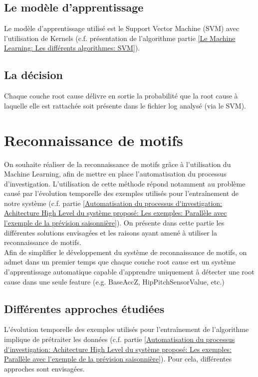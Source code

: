 \subsection{Le modèle d'apprentissage}
\label{Automatisation du processus d'investigation: Achitecture High Level du système proposé: Le modèle d'apprentissage}
Le modèle d'apprentissage utilisé est le Support Vector Machine (SVM) avec l'utilisation de Kernels (c.f. présentation de l'algorithme partie \ref{Le Machine Learning: Les différents algorithmes: SVM}).


\subsection{La décision}
\label{Automatisation du processus d'investigation: Achitecture High Level du système proposé: La décision}
Chaque couche root cause délivre en sortie la probabilité que la root cause à laquelle elle est rattachée soit présente dans le fichier log analysé (via le SVM).



\section{Reconnaissance de motifs}
\label{Automatisation du processus d'investigation: Reconnaissance de motifs}
On souhaite réaliser de la reconnaissance de motifs grâce à l'utilisation du Machine Learning, afin de mettre en place l'automatisation du processus d'investigation. L'utilisation de cette méthode répond notamment au problème causé par l'évolution temporelle des exemples utilisés pour l'entraînement de notre système (c.f. partie \ref{Automatisation du processus d'investigation: Achitecture High Level du système proposé: Les exemples: Parallèle avec l'exemple de la prévision saisonnière}). On présente dans cette partie les différentes solutions envisagées et les raisons ayant amené à utiliser la reconnaissance de motifs. \\

Afin de simplifier le développement du système de reconnaissance de motifs, on admet dans un premier temps que chaque couche root cause est un système d'apprentissage automatique capable d'apprendre uniquement à détecter une root cause dans une seule feature (e.g. BaseAccZ, HipPitchSensorValue, etc.) 

\subsection{Différentes approches étudiées}
\label{Automatisation du processus d'investigation: Reconnaissance de motifs: Différentes approches étudiées}
L'évolution temporelle des exemples utilisés pour l'entraînement de l'algorithme implique de prétraiter les données (c.f. partie \ref{Automatisation du processus d'investigation: Achitecture High Level du système proposé: Les exemples: Parallèle avec l'exemple de la prévision saisonnière}). Pour cela, différentes approches sont envisagées.

